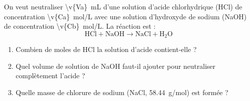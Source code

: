 On veut neutraliser \qty{\v{Va}}{mL} d'une solution d'acide chlorhydrique (HCl) de concentration \qty{\v{Ca}}{mol/L} avec une solution d'hydroxyde de sodium (NaOH) de concentration \qty{\v{Cb}}{mol/L}. La réaction est :
\[ \mathrm{HCl + NaOH \longrightarrow NaCl + H_2O} \]

\begin{enumerate}[label=\alph*)]
    \item Combien de moles de HCl la solution d'acide contient-elle ?
    \item Quel volume de solution de NaOH faut-il ajouter pour neutraliser complètement l'acide ?
    \item Quelle masse de chlorure de sodium (NaCl, \qty{58.44}{g/mol}) est formée ?
\end{enumerate}

